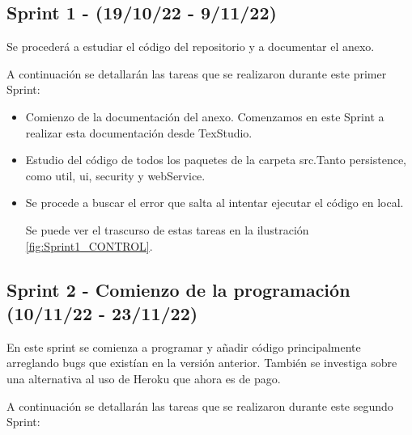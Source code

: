 \subsection{Sprint 1 - (19/10/22 - 9/11/22)}

Se procederá a estudiar el código del repositorio y a documentar el anexo.

A continuación se detallarán las tareas que se realizaron durante este primer Sprint:

\begin{itemize}
	
	\item Comienzo de la documentación del anexo. Comenzamos en este Sprint a realizar esta documentación desde TexStudio.
	
	\item Estudio del código de todos los paquetes de la carpeta src.Tanto persistence, como util, ui, security y webService.
	
	\item Se procede a buscar el error que salta al intentar ejecutar el código en local.
	
	Se puede ver el trascurso de estas tareas en la ilustración \ref{fig:Sprint1_CONTROL}.
	
\end{itemize}

\subsection{Sprint 2 - Comienzo de la programación (10/11/22 - 23/11/22)}

En este sprint se comienza a programar y añadir código principalmente arreglando bugs que existían en la versión anterior. También se investiga sobre una alternativa al uso de Heroku que ahora es de pago.

A continuación se detallarán las tareas que se realizaron durante este segundo Sprint:


